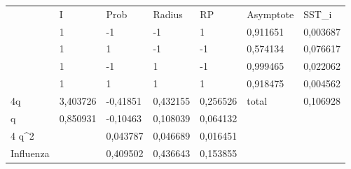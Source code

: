 \begin{table}[H]
\centering
\begin{tabular}{l|l|l|l|l|ll}
\cline{2-7}
 & I & Prob & Radius & RP & \multicolumn{1}{l|}{Asymptote} & \multicolumn{1}{l|}{SST\_i} \\ \cline{2-7} 
 & 1 & -1 & -1 & 1 & \multicolumn{1}{l|}{0,911651} & \multicolumn{1}{l|}{0,003687} \\ \cline{2-7} 
 & 1 & 1 & -1 & -1 & \multicolumn{1}{l|}{0,574134} & \multicolumn{1}{l|}{0,076617} \\ \cline{2-7} 
 & 1 & -1 & 1 & -1 & \multicolumn{1}{l|}{0,999465} & \multicolumn{1}{l|}{0,022062} \\ \cline{2-7} 
 & 1 & 1 & 1 & 1 & \multicolumn{1}{l|}{0,918475} & \multicolumn{1}{l|}{0,004562} \\ \hline
\multicolumn{1}{|l|}{4q} & 3,403726 & -0,41851 & 0,432155 & 0,256526 & \multicolumn{1}{l|}{total} & \multicolumn{1}{l|}{0,106928} \\ \hline
\multicolumn{1}{|l|}{q} & 0,850931 & -0,10463 & 0,108039 & 0,064132 &  &  \\ \cline{1-5}
\multicolumn{1}{|l|}{4 q\textasciicircum{}2} &  & 0,043787 & 0,046689 & 0,016451 &  &  \\ \cline{1-5}
\multicolumn{1}{|l|}{Influenza} &  & 0,409502 & 0,436643 & 0,153855 &  &  \\ \cline{1-5}
\end{tabular}
\end{table}
%